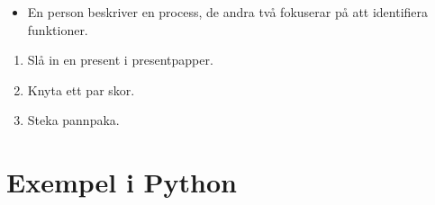 \begin{frame}
  \begin{exercise}
    \begin{itemize}
      \item En person beskriver en process, de andra två fokuserar på att 
        identifiera funktioner.
    \end{itemize}
    \begin{enumerate}
      \item Slå in en present i presentpapper.
      \item Knyta ett par skor.
      \item Steka pannpaka.
    \end{enumerate}
  \end{exercise}
\end{frame}

\section{Exempel i Python}

\begin{frame}
\end{frame}
